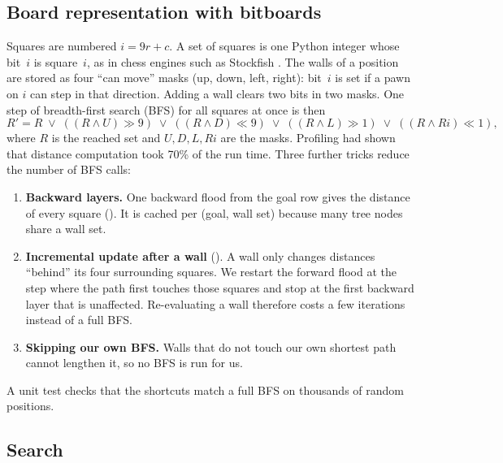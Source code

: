 \subsection{Board representation with bitboards}
\label{sec:bitboard}
Squares are numbered $i = 9r + c$. A set of squares is one Python integer whose bit~$i$ is
square~$i$, as in chess engines such as Stockfish \citep{stockfish}. The walls of a position are
stored as four ``can move'' masks (up, down, left, right): bit~$i$ is set if a pawn on $i$ can
step in that direction. Adding a wall clears two bits in two masks. One step of breadth-first
search (BFS) for all squares at once is then
\begin{equation}
  R' = R \;\lor\; ((R \land U) \gg 9) \;\lor\; ((R \land D) \ll 9)
       \;\lor\; ((R \land L) \gg 1) \;\lor\; ((R \land Ri) \ll 1),
  \label{eq:flood}
\end{equation}
where $R$ is the reached set and $U, D, L, Ri$ are the masks.
Profiling had shown that distance computation took 70\% of the run time. Three further tricks
reduce the number of BFS calls:
\begin{enumerate}
  \item \textbf{Backward layers.} One backward flood from the goal row gives the distance of
        every square (). It is cached per (goal, wall set) because many tree
        nodes share a wall set.
  \item \textbf{Incremental update after a wall} (). A wall only
        changes distances ``behind'' its four surrounding squares. We restart the forward flood
        at the step where the path first touches those squares and stop at the first backward
        layer that is unaffected. Re-evaluating a wall therefore costs a few iterations instead
        of a full BFS.
  \item \textbf{Skipping our own BFS.} Walls that do not touch our own shortest path cannot
        lengthen it, so no BFS is run for us.
\end{enumerate}
A unit test checks that the shortcuts match a full BFS on thousands of random positions.

\subsection{Search}
\label{sec:search}
